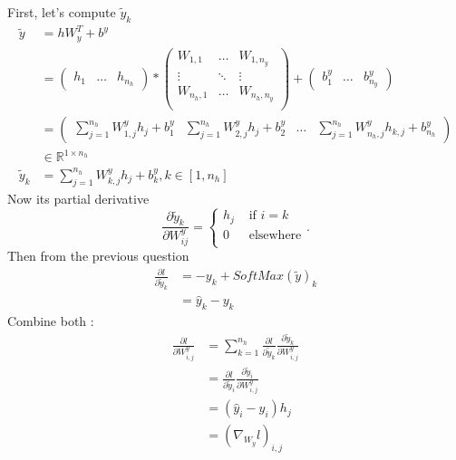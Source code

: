 \documentclass{article}
\theoremstyle{plain}%
\theoremstyle{definition}
\theoremstyle{remark}
\begin{document}
First, let's compute $ \tilde{y}_k $ 
\begin{align*}
    \tilde{y} &= h W_y^T + b^y\\
    &= \begin{pmatrix}
        h_{1} & \dots & h_{n_h}
    \end{pmatrix} * \begin{pmatrix}
        W_{1, 1} & \dots  & W_{1, n_y} \\
        \vdots   & \ddots  & \vdots \\
        W_{n_h, 1}  & \dots  & W_{n_h, n_y} \\
    \end{pmatrix} + \begin{pmatrix}
        b^y_1 & \dots & b^y_{n_y}
    \end{pmatrix} \\
    &= \begin{pmatrix}
        \sum_{j=1}^{n_h} W^y_{1,j} h_{j} + b^y_1 & \sum_{j=1}^{n_h} W^y_{2,j} h_{j} + b^y_2 & \dots & \sum_{j=1}^{n_h} W^y_{n_h,j} h_{k,j} + b^y_{n_h}
    \end{pmatrix} \\
    &\in \mathbb{R}^{1 \times n_h} \\
    \tilde{y}_k &= \sum_{j=1}^{n_h} W^y_{k,j} h_{j} + b_k^y, k \in [1, n_h]
\end{align*}
Now its partial derivative
\[
    \frac{\partial \tilde{y}_k }{\partial W^y_{ij}} = \begin{cases}
        h_j &\text{ if } i=k \\
        0 &\text{ elsewhere}\\
    \end{cases} 
.\]
Then from the previous question
\begin{align*}
    \frac{\partial l}{\partial \tilde{y}_k} &= -y_k + SoftMax(\tilde{y})_k \\
    &= \hat{y}_k - y_k
\end{align*}
Combine both : 
\begin{align*}
    \frac{\partial l}{\partial W_{i,j}^y} &= \sum_{k=1}^{n_h} \frac{\partial l}{\partial \tilde{y}_k} \frac{\partial \tilde{y}_k}{\partial W_{i,j}^y} \\
    &= \frac{\partial l}{\partial \tilde{y}_i} \frac{\partial \tilde{y}_i}{\partial W_{i,j}^y} \\
    &= (\hat{y}_i - y_i) h_{j} \\
    &= (\nabla _{W_y} l)_{i,j}
\end{align*}
\end{document}
